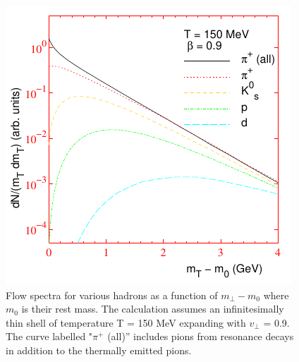 \documentclass[12pt,a4paper]{book}
\begin{document}
	\begin{figure}[ht]
		\centering
		\includegraphics[width=0.4\linewidth]{pictures/flow_spectra.png}
		\caption{Flow spectra for various hadrons as a function of $m_\perp-m_0$ where $m_0$ is their rest mass. The calculation assumes an infinitesimally thin shell of temperature T = 150 MeV expanding with $v_\perp$ = 0.9. The curve labelled "$\pi^+$ (all)” includes pions from resonance decays in addition to the thermally emitted pions.}
		\label{fig:flow_spectra} 
	\end{figure}
	
\end{document}
